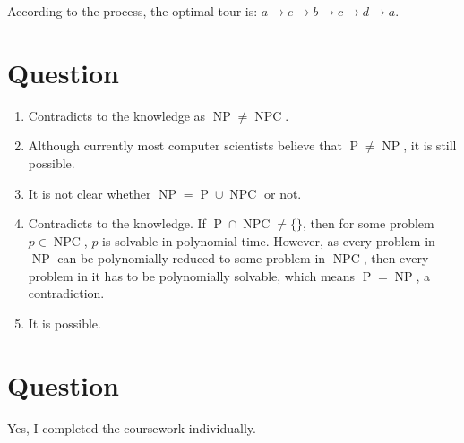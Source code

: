 \documentclass{article}
\begin{document}
According to the process, the optimal tour is: $a \to e \to b \to c \to d \to a$.

\section{Question }
\begin{enumerate}
	\item Contradicts to the knowledge as $\operatorname{NP} \ne \operatorname{NPC}$.
	\item Although currently most computer scientists believe that $\operatorname{P} \ne \operatorname{NP}$, it is still possible.
	\item It is not clear whether $\operatorname{NP} = \operatorname{P} \cup \operatorname{NPC}$ or not.
	\item Contradicts to the knowledge. If $\operatorname{P} \cap \operatorname{NPC} \ne \{\}$, then for some problem $p \in \operatorname{NPC}$, $p$ is solvable in polynomial time. However, as every problem in $\operatorname{NP}$ can be polynomially reduced to some problem in $\operatorname{NPC}$, then every problem in it has to be polynomially solvable, which means $\operatorname{P} = \operatorname{NP}$, a contradiction.
	\item It is possible.
\end{enumerate}

\section{Question }
Yes, I completed the coursework individually.
\end{document}
